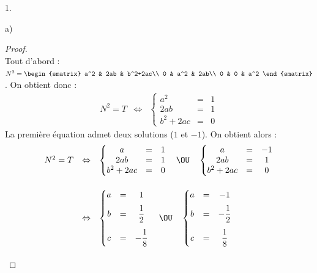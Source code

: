 \begin{noliste}{1.}
\begin{noliste}{a)}
    \begin{proof}~\\
      Tout d'abord : $N^2=
      \begin{smatrix}
        a^2 &  2ab &  b^2+2ac\\ 
        0 &  a^2 &  2ab\\ 
        0 &  0 &  a^2 
      \end{smatrix}$. On obtient donc :
      \[
      \begin{array}{rcl}
        N^2=T & \Leftrightarrow & \left\{
          \begin{matrix}
            a^2 & = & 1\\
            2ab & = & 1\\
            b^2+2ac & = & 0
          \end{matrix}
        \right.
      \end{array}
      \]
      La première équation admet deux solutions ($1$ et $-1$). On 
      obtient alors :~\\[-.2cm]
      \[
      \begin{array}{rcl}
        N^2=T & \Leftrightarrow & \left\{
          \begin{matrix}
            a & = & 1\\
            2ab & = &  1\\
            b^2+2ac & = & 0
          \end{matrix}
        \right. \quad \OU \quad \left\{
          \begin{matrix}
            a & = &  -1\\
            2ab & = & 1\\
            b^2+2ac & = &  0
          \end{matrix}
        \right.
        \\[1cm]
        & \Leftrightarrow & \left\{
          \begin{matrix}
            a & = & 1\\[.2cm]
            b & = & \dfrac{1}{2}\\[.4cm]
            c & = & -\dfrac{1}{8}
          \end{matrix}
        \right. \quad \OU \quad \left\{
          \begin{matrix}
            a & = &  -1\\[.2cm]
            b & = & -\dfrac{1}{2}\\[.4cm]
            c & = & \dfrac{1}{8}
          \end{matrix}
        \right.
        \\[1.2cm]

\end{array}\]
\end{proof}
\end{noliste}
\end{noliste}
